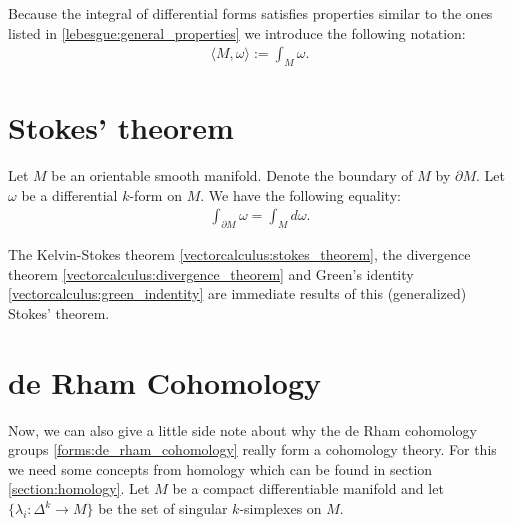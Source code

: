 
    \begin{notation}
        Because the integral of differential forms satisfies properties similar to the ones listed in \ref{lebesgue:general_properties} we introduce the following notation:
        \begin{gather}
            \langle M, \omega \rangle := \int_M\omega.
        \end{gather}
    \end{notation}

\section{Stokes' theorem}

    \begin{theorem}
        \label{forms:theorem:stokes_theorem}
        Let $M$ be an orientable smooth manifold. Denote the boundary of $M$ by $\partial M$. Let $\omega$ be a differential $k$-form on $M$. We have the following equality:
        \begin{gather}
            \int_{\partial M}\omega = \int_M d\omega.
        \end{gather}
    \end{theorem}
    \begin{result}
        The Kelvin-Stokes theorem \ref{vectorcalculus:stokes_theorem}, the divergence theorem \ref{vectorcalculus:divergence_theorem} and Green's identity \ref{vectorcalculus:green_indentity} are immediate results of this (generalized) Stokes' theorem.
    \end{result}

\section{de Rham Cohomology}

    Now, we can also give a little side note about why the de Rham cohomology groups \ref{forms:de_rham_cohomology} really form a cohomology theory. For this we need some concepts from homology which can be found in section \ref{section:homology}. Let $M$ be a compact differentiable manifold and let $\{\lambda_i:\Delta^k\rightarrow M\}$ be the set of singular $k$-simplexes on $M$.

